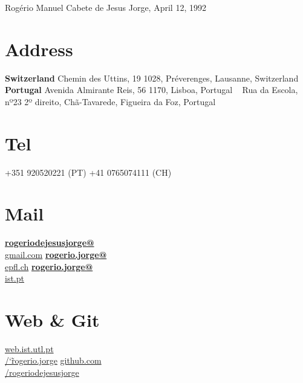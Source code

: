 \documentclass[]{friggeri-cv}
\begin{document}
      {\hspace{3.0cm}Rogério Manuel Cabete de Jesus Jorge, April 12, 1992}
      

\begin{aside}
  \section{Address}
    \textbf{Switzerland}
    Chemin des Uttins, 19 1028, Préverenges, Lausanne, Switzerland
    ~
    \textbf{Portugal}
    Avenida Almirante Reis, 56 1170, Lisboa, Portugal
    ~
    Rua da Escola, nº23 2º direito, Chã-Tavarede, Figueira da Foz, Portugal
    ~
  \section{Tel}
    +351 920520221 (PT)
    +41 0765074111 (CH)
    ~
  \section{Mail}
    \href{mailto:rogeriodejesusjorge@gmail.com}{\textbf{rogeriodejesusjorge@}\\gmail.com}
    \href{mailto:rogerio.jorge@epfl.ch}{\textbf{rogerio.jorge@}\\epfl.ch}
    \href{mailto:rogerio.jorge@ist.pt}{\textbf{rogerio.jorge@}\\ist.pt}
    ~
  \section{Web \& Git}
    \href{http://web.ist.utl.pt/~rogerio.jorge}{web.ist.utl.pt\\/\char`\~rogerio.jorge}
    \href{https://github.com/rogeriodejesusjorge}{github.com\\/rogeriodejesusjorge}
    ~

\end{aside}
\end{document}
